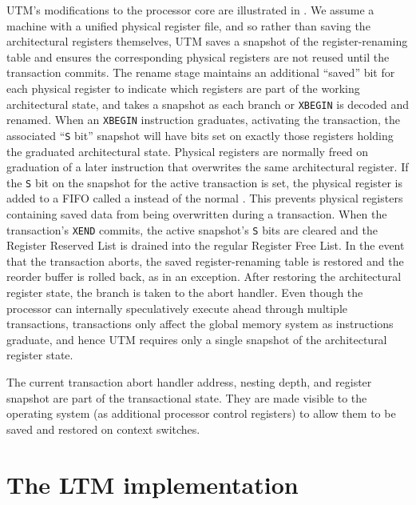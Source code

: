 UTM's modifications to the processor core are illustrated in
.  We assume a machine with a unified physical
register file, and so rather than saving the architectural registers
themselves, UTM saves a snapshot of the register-renaming table
and ensures the corresponding physical registers are not reused until
the transaction commits.
The rename stage maintains an additional ``saved'' bit
for each physical register 
to indicate which registers are part of the working
architectural state, and takes a snapshot as
each branch or \texttt{XBEGIN} is decoded and renamed.
When an \texttt{XBEGIN} instruction
graduates, activating the transaction, the associated ``\texttt{S} bit''
snapshot will have bits set
on exactly those registers holding the graduated architectural state.  Physical
registers are normally freed on graduation of a later instruction that
overwrites the same architectural register.  If the \texttt{S} bit on
the snapshot for the active transaction is
set, the physical register is added to a FIFO called a  instead of the normal .  This
prevents physical registers containing saved data from being
overwritten during a transaction.  When the
transaction's \texttt{XEND} commits, the active snapshot's \texttt{S}
bits are cleared and the Register
Reserved List is drained into the regular Register Free List.  In the
event that the transaction aborts, the saved register-renaming table
is restored and the reorder buffer is rolled back, as in an exception.
After restoring the architectural register state, the branch is taken
to the abort handler.  Even though the processor can internally
speculatively execute ahead through multiple transactions,
transactions only affect the global memory system as instructions
graduate, and hence UTM requires only a single snapshot of the
architectural register state.


The current transaction abort handler address, nesting depth, and
register snapshot are part of the transactional state.  They are made
visible to the operating system (as additional processor control
registers) to allow them to be saved and restored on context switches.

\section{The LTM implementation}\label{sec:ltm}

